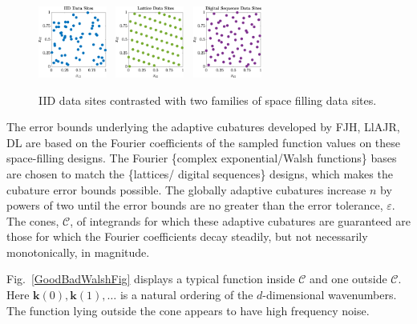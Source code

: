 \documentclass[11pt]{NSFamsart}
\newcommand{\bk}{{\boldsymbol{k}}}
\newcommand{\calc}{{\mathcal{C}}}
\begin{document}
\begin{figure} %
	\centering
	\includegraphics[width = 0.20\textwidth]{ProgramsImages/IIDPoints.eps} \ 
	\includegraphics[width = 0.20\textwidth]{ProgramsImages/ShiftedLatticePoints.eps}  \ 
	\includegraphics[width = 0.20\textwidth]{ProgramsImages/SSobolPoints.eps} 
	
	\caption{IID data sites contrasted with two families of space filling data sites.\label{PtsFig}}
\end{figure}

The error bounds underlying the adaptive cubatures developed by FJH, LlAJR, DL are based on the Fourier coefficients of the sampled function values on these space-filling designs.  The Fourier  \{complex exponential/Walsh functions\} bases are chosen to match the \{lattices/ digital sequences\}  designs, which makes the cubature error bounds possible.  The globally adaptive cubatures increase $n$ by powers of two until the error bounds are no greater than the error tolerance, $\varepsilon$.  The cones, $\calc$, of integrands for which these adaptive cubatures are guaranteed are those for which  the Fourier coefficients decay steadily, but not necessarily monotonically, in magnitude.

\iffalse
Fig.\ \ref{GoodBadWalshFig} displays a typical function inside $\calc$ and one outside $\calc$. Here $\bk(0), \bk(1), \ldots$ is a natural ordering of the $d$-dimensional wavenumbers.  The function lying outside the cone appears to have high frequency noise. 
\end{document}

